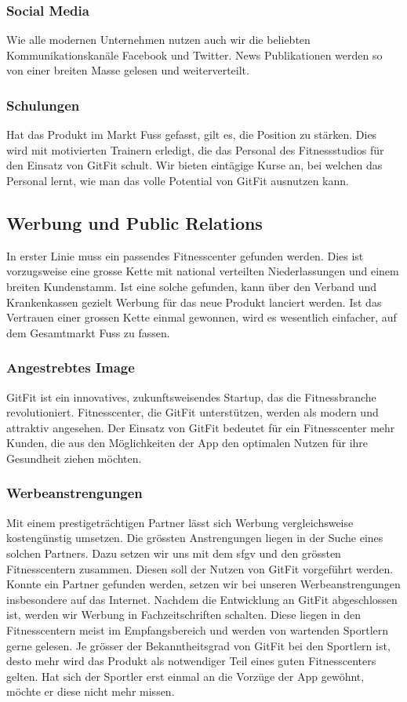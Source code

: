 \subsubsection{Social Media}
Wie alle modernen Unternehmen nutzen auch wir die beliebten
Kommunikationskanäle Facebook und Twitter. News Publikationen werden so
von einer breiten Masse gelesen und weiterverteilt.

\subsubsection{Schulungen}
Hat das Produkt im Markt Fuss gefasst, gilt es, die Position zu stärken. Dies wird mit motivierten Trainern erledigt, die das Personal des Fitnessstudios für den Einsatz von GitFit schult. Wir bieten eintägige Kurse an, bei welchen das Personal lernt, wie man das volle Potential von GitFit ausnutzen kann.

\subsection{Werbung und Public Relations}
In erster Linie muss ein passendes Fitnesscenter gefunden werden. Dies ist vorzugsweise eine grosse Kette mit national verteilten Niederlassungen und einem breiten Kundenstamm. Ist eine solche gefunden, kann über den Verband und Krankenkassen gezielt Werbung für das neue Produkt lanciert werden. Ist das Vertrauen einer grossen Kette einmal gewonnen, wird es wesentlich einfacher, auf dem Gesamtmarkt Fuss zu fassen.

\subsubsection{Angestrebtes Image}
GitFit ist ein innovatives, zukunftsweisendes Startup, das die Fitnessbranche revolutioniert. Fitnesscenter, die GitFit unterstützen, werden als modern und attraktiv angesehen. Der Einsatz von GitFit bedeutet für ein Fitnesscenter mehr Kunden, die aus den Möglichkeiten der App den optimalen Nutzen für ihre Gesundheit ziehen möchten.

\subsubsection{Werbeanstrengungen}
Mit einem prestigeträchtigen Partner lässt sich Werbung vergleichsweise kostengünstig umsetzen. Die grössten Anstrengungen liegen in der Suche eines solchen Partners. Dazu setzen wir uns mit dem \gls{sfgv} und den grössten Fitnesscentern zusammen. Diesen soll der Nutzen von GitFit vorgeführt werden. Konnte ein Partner gefunden werden, setzen wir bei unseren Werbeanstrengungen insbesondere auf das Internet. Nachdem die Entwicklung an GitFit abgeschlossen ist, werden wir Werbung in Fachzeitschriften schalten. Diese liegen in den Fitnesscentern meist im Empfangsbereich und werden von wartenden Sportlern gerne gelesen. Je grösser der Bekanntheitsgrad von GitFit bei den Sportlern ist, desto mehr wird das Produkt als notwendiger Teil eines guten Fitnesscenters gelten. Hat sich der Sportler erst einmal an die Vorzüge der App gewöhnt, möchte er diese nicht mehr missen.

